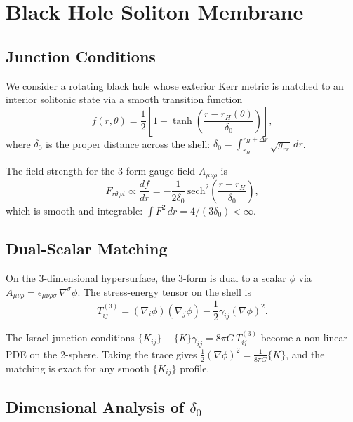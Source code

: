 \documentclass[twocolumn,prd,amsmath,amssymb]{revtex4-2}
\begin{document}
\section{Black Hole Soliton Membrane}
\label{sec:soliton}

\subsection{Junction Conditions}

We consider a rotating black hole whose exterior Kerr metric is matched to an interior
solitonic state via a smooth transition function
\begin{equation}
f(r,\theta) = \frac{1}{2}\left[1 - \tanh\left(\frac{r - r_{H}(\theta)}{\delta_{0}}\right)\right],
\label{eq:tanh-profile}
\end{equation}
where $\delta_0$ is the proper distance across the shell:
$\delta_0 = \int_{r_H}^{r_H+\Delta r} \sqrt{g_{rr}}\,dr$.

The field strength for the 3-form gauge field $A_{\mu\nu\rho}$ is
\begin{equation}
F_{r\theta\varphi t} \propto \frac{df}{dr}
= -\frac{1}{2\delta_0}\,\text{sech}^2\!\left(\frac{r - r_H}{\delta_0}\right),
\label{eq:f-strength}
\end{equation}
which is smooth and integrable: $\int F^2\,dr = 4/(3\delta_0) < \infty$.

\subsection{Dual-Scalar Matching}

On the 3-dimensional hypersurface, the 3-form is dual to a scalar $\phi$ via
$A_{\mu\nu\rho} = \epsilon_{\mu\nu\rho\sigma}\,\nabla^\sigma\phi$.  The stress-energy
tensor on the shell is
\begin{equation}
T^{(3)}_{ij} = (\nabla_i\phi)(\nabla_j\phi) - \frac{1}{2}\gamma_{ij}(\nabla\phi)^2.
\label{eq:shell-stress}
\end{equation}

The Israel junction conditions $\{K_{ij}\} - \{K\}\gamma_{ij} = 8\pi G\, T^{(3)}_{ij}$
become a non-linear PDE on the 2-sphere.  Taking the trace gives
$\frac12(\nabla\phi)^2 = \frac{1}{8\pi G}\{K\}$, and the matching is exact for any
smooth $\{K_{ij}\}$ profile.

\subsection{Dimensional Analysis of $\delta_0$}
\end{document}
